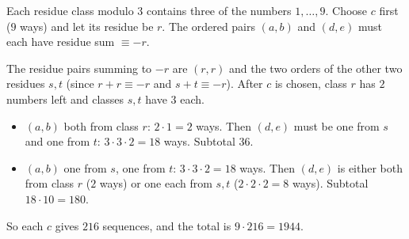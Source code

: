 Each residue class modulo $3$ contains three of the numbers $1,\dots,9$. Choose $c$ first ($9$ ways) and let its residue be $r$. The ordered pairs $(a,b)$ and $(d,e)$ must each have residue sum $\equiv -r$.

The residue pairs summing to $-r$ are $(r,r)$ and the two orders of the other two residues $s,t$ (since $r+r\equiv-r$ and $s+t\equiv-r$). After $c$ is chosen, class $r$ has $2$ numbers left and classes $s,t$ have $3$ each.

\begin{itemize}
\item $(a,b)$ both from class $r$: $2\cdot1=2$ ways. Then $(d,e)$ must be one from $s$ and one from $t$: $3\cdot3\cdot2=18$ ways. Subtotal $36$.
\item $(a,b)$ one from $s$, one from $t$: $3\cdot3\cdot2=18$ ways. Then $(d,e)$ is either both from class $r$ ($2$ ways) or one each from $s,t$ ($2\cdot2\cdot2=8$ ways). Subtotal $18\cdot10=180$.
\end{itemize}
So each $c$ gives $216$ sequences, and the total is $9\cdot216=\boxed{1944}$.
